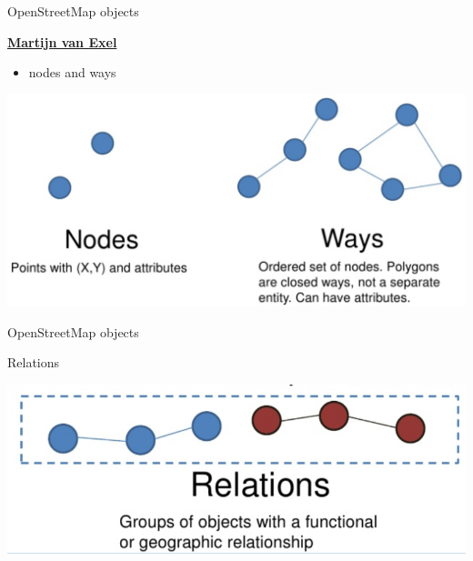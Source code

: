 \documentclass[ignorenonframetext,]{beamer}
\providecommand{\tightlist}{%
  \setlength{\itemsep}{0pt}\setlength{\parskip}{0pt}}
\begin{document}
\begin{frame}{OpenStreetMap objects}
\protect\hypertarget{openstreetmap-objects}{}

\begin{block}{\href{https://www.slideshare.net/mvexel/openstreetmap-9819440}{\textbf{Martijn
van Exel}}}

\begin{itemize}
\tightlist
\item
  nodes and ways
\end{itemize}

\includegraphics{figure/Nodes_ways.PNG}

\end{block}

\end{frame}

\begin{frame}{OpenStreetMap objects}
\protect\hypertarget{openstreetmap-objects-1}{}

\begin{block}{Relations}

\includegraphics{figure/relations.PNG}

\end{block}

\end{frame}
\end{document}
